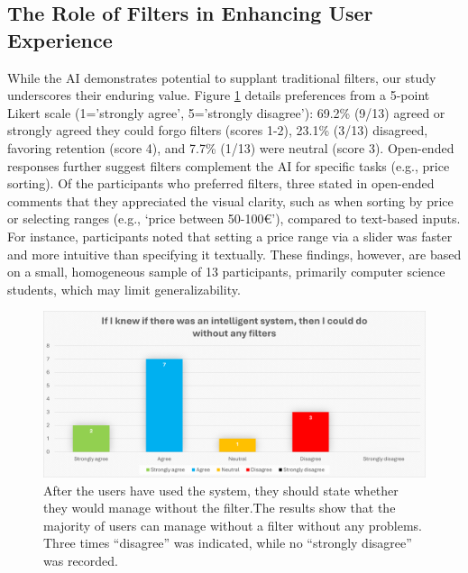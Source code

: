\documentclass[../../submission.tex]{subfiles}
\begin{document}
\subsection{The Role of Filters in Enhancing User Experience}
While the AI demonstrates potential to supplant traditional filters, our study 
underscores their enduring value. Figure \ref{fig:without_filter} details preferences from a 5-point 
Likert scale (1='strongly agree', 5='strongly disagree'): 69.2\% (9/13) agreed or strongly 
agreed they could forgo filters (scores 1-2), 23.1\% (3/13) disagreed, favoring retention (score 4), 
and 7.7\% (1/13) were neutral (score 3). Open-ended responses further suggest filters 
complement the AI for specific tasks (e.g., price sorting).
Of the participants who preferred filters, three stated in open-ended comments 
that they appreciated the visual clarity, such as when sorting by price or selecting 
ranges (e.g., ‘price between 50-100€’), compared to text-based inputs. 
For instance, participants noted that setting a price range via a slider was 
faster and more intuitive than specifying it textually.
These findings, however, are based on a small, homogeneous sample of 13 participants, 
primarily computer science students, which may limit generalizability.



\begin{figure}[h]
\includegraphics[width=\textwidth]{images/without_filter}
\caption{After the users have used the system, they should state whether they would manage without the filter.The results show that the majority of users can manage without a filter without any problems. Three times “disagree” was indicated, while no “strongly disagree” was recorded.}
\Description{}
\label{fig:without_filter}
\end{figure}
\end{document}
